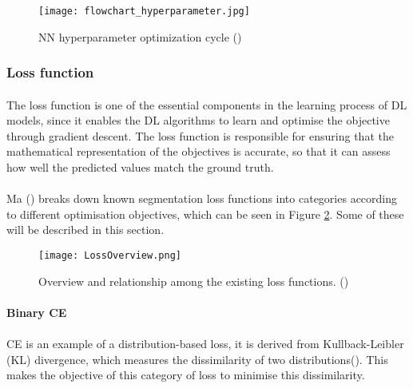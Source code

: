     \begin{figure}[hbt!]
        \centering
        \texttt{[image: flowchart\_hyperparameter.jpg]}
        \caption{NN hyperparameter optimization cycle (\cite{hyperparameter_fig})}
        \label{fig_hyperparameter}
    \end{figure}


\subsubsection{Loss function} \label{loss_functions}
\paragraph{}
The loss function is one of the essential components in the learning process of \gls{DL} models, since it enables the \gls{DL} algorithms to learn and optimise the objective through gradient descent. The loss function is responsible for ensuring that the mathematical representation of the objectives is accurate, so that it can assess how well the predicted values match the ground truth.
\paragraph{}
Ma (\cite{LossOdyssey}) breaks down known segmentation loss functions into categories according to different optimisation objectives, which can be seen in Figure \ref{fig_loss_odissey}. Some of these will be described in this section.

    \begin{figure}[hbt!]
        \centering
        \texttt{[image: LossOverview.png]}
        \caption{Overview and relationship among the existing loss functions. (\cite{LossOdyssey})}
        \label{fig_loss_odissey}
    \end{figure}


\paragraph{Binary \gls{CE}}
\paragraph{}
\gls{CE} is an example of a distribution-based loss, it is derived from Kullback-Leibler (KL) divergence, which measures the dissimilarity of two distributions(\cite{LossOdyssey}). This makes the objective of this category of loss to minimise this dissimilarity. 


